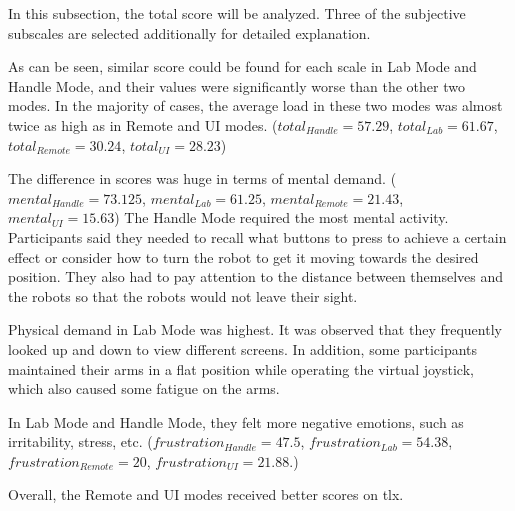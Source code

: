 In this subsection, the total score will be analyzed. Three of the subjective subscales are selected additionally for detailed explanation.

As can be seen, similar score could be found for each scale in Lab Mode and Handle Mode, and their values were significantly worse than the other two modes. In the majority of cases, the average load in these two modes was almost twice as high as in Remote and UI modes. ($total_{Handle} = 57.29$, $total_{Lab} = 61.67$, $total_{Remote} = 30.24$, $total_{UI} = 28.23$) 

The difference in scores was huge in terms of mental demand. ($mental_{Handle} = 73.125$, $mental_{Lab} = 61.25$, $mental_{Remote} = 21.43$, $mental_{UI} = 15.63$) The Handle Mode required the most mental activity. Participants said they needed to recall what buttons to press to achieve a certain effect or consider how to turn the robot to get it moving towards the desired position. They also had to pay attention to the distance between themselves and the robots so that the robots would not leave their sight.

 Physical demand in Lab Mode was highest. It was observed that they frequently looked up and down to view different screens. In addition, some participants maintained their arms in a flat position while operating the virtual joystick, which also caused some fatigue on the arms. 

In Lab Mode and Handle Mode, they felt more negative emotions, such as irritability, stress, etc. ($frustration_{Handle} = 47.5$, $frustration_{Lab} = 54.38$, $frustration_{Remote} = 20$, $frustration_{UI} = 21.88$.)

Overall, the Remote and UI modes received better scores on \gls{tlx}.






